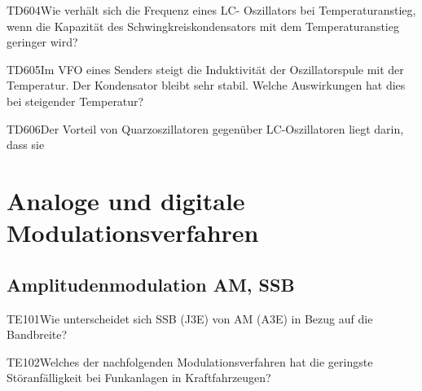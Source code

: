 \begin{question}{TD604}{Wie verhält sich die Frequenz eines LC- Oszillators bei Temperaturanstieg, wenn die Kapazität des Schwingkreiskondensators mit dem Temperaturanstieg geringer wird?}
\end{question}

\begin{question}{TD605}{Im VFO eines Senders steigt die Induktivität der Oszillatorspule mit der Temperatur. Der Kondensator bleibt sehr stabil. Welche Auswirkungen hat dies bei steigender Temperatur?}
\end{question}

\begin{question}{TD606}{Der Vorteil von Quarzoszillatoren gegenüber LC-Oszillatoren liegt darin, dass sie}
\end{question}

\section{Analoge und digitale Modulationsverfahren}

\subsection{Amplitudenmodulation AM, SSB}

\begin{question}{TE101}{Wie unterscheidet sich SSB (J3E) von AM (A3E) in Bezug auf die Bandbreite?}
\end{question}

\begin{question}{TE102}{Welches der nachfolgenden Modulationsverfahren hat die geringste Störanfälligkeit bei Funkanlagen in Kraftfahrzeugen?}
\end{question}

